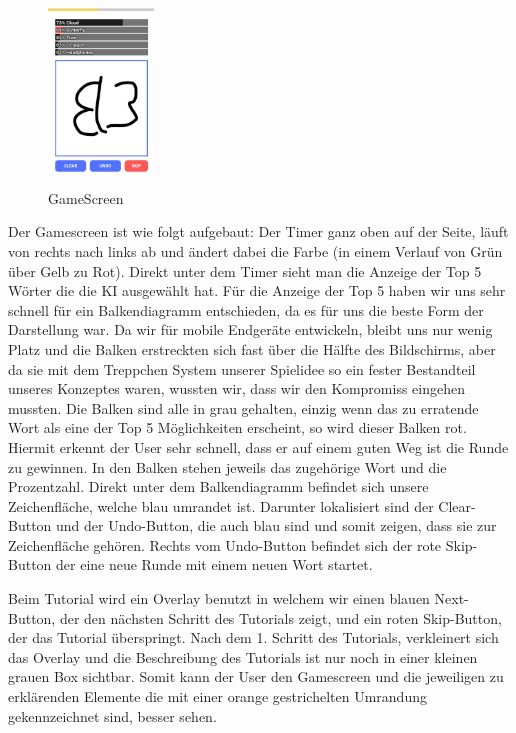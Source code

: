 \documentclass[11pt]{article}
\begin{document}
\begin{figure}
\centering
\includegraphics[width=0.25\textwidth]{images/Gamescreen.jpg}
\caption{\label{fig:Gamescreen}GameScreen}
\end{figure}

Der Gamescreen ist wie folgt aufgebaut: Der Timer ganz oben auf der Seite, läuft von rechts nach links ab und ändert dabei die Farbe (in einem Verlauf von Grün über Gelb zu Rot). Direkt unter dem Timer sieht man die Anzeige der Top 5 Wörter die die KI ausgewählt hat. Für die Anzeige der Top 5 haben wir uns sehr schnell für ein Balkendiagramm entschieden, da es für uns die beste Form der Darstellung war. 
Da wir für mobile Endgeräte entwickeln, bleibt uns nur wenig Platz und die Balken erstreckten sich fast über die Hälfte des Bildschirms, aber da sie mit dem Treppchen System unserer Spielidee so ein fester Bestandteil unseres Konzeptes waren, wussten wir, dass wir den Kompromiss eingehen mussten. 
Die Balken sind alle in grau gehalten, einzig wenn das zu erratende Wort als eine der Top 5 Möglichkeiten erscheint, so wird dieser Balken rot. Hiermit erkennt der User sehr schnell, dass er auf einem guten Weg ist die Runde zu gewinnen. In den Balken stehen jeweils das zugehörige Wort und die Prozentzahl. 
Direkt unter dem Balkendiagramm befindet sich unsere Zeichenfläche, welche blau umrandet ist. Darunter lokalisiert sind der Clear-Button und der Undo-Button, die auch blau sind und somit zeigen, dass sie zur Zeichenfläche gehören. Rechts vom Undo-Button befindet sich der rote Skip-Button der eine neue Runde mit einem neuen Wort startet.

Beim Tutorial wird ein Overlay benutzt in welchem wir einen blauen Next-Button, der den nächsten Schritt des Tutorials zeigt, und ein roten Skip-Button, der das Tutorial überspringt. Nach dem 1. Schritt des Tutorials, verkleinert sich das Overlay und die Beschreibung des Tutorials ist nur noch in einer kleinen grauen Box sichtbar. 
Somit kann der User den Gamescreen und die jeweiligen zu erklärenden Elemente die mit einer orange gestrichelten Umrandung gekennzeichnet sind, besser sehen.
\end{document}
